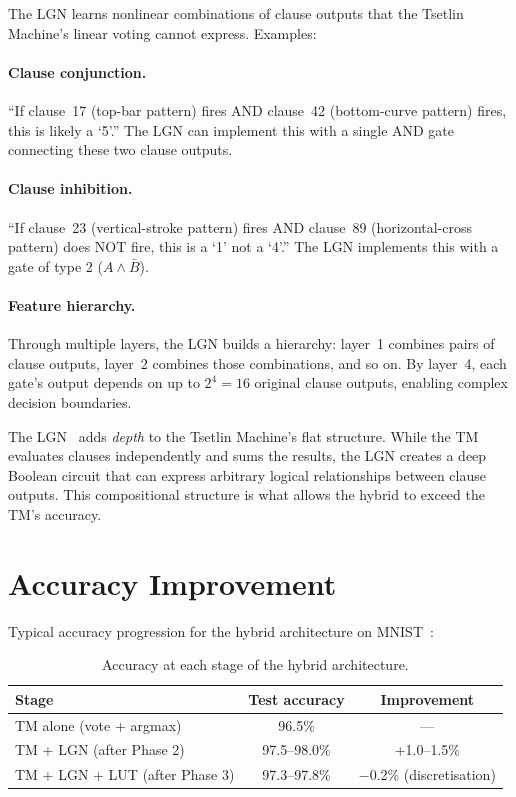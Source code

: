 The LGN learns nonlinear combinations of clause outputs that the
Tsetlin Machine's linear voting cannot express. Examples:

\paragraph{Clause conjunction.}
``If clause~17 (top-bar pattern) fires AND clause~42 (bottom-curve
pattern) fires, this is likely a `5'.'' The LGN can implement this
with a single AND gate connecting these two clause outputs.

\paragraph{Clause inhibition.}
``If clause~23 (vertical-stroke pattern) fires AND clause~89
(horizontal-cross pattern) does NOT fire, this is a `1' not a `4'.''
The LGN implements this with a gate of type 2 ($A \wedge \bar{B}$).

\paragraph{Feature hierarchy.}
Through multiple layers, the LGN builds a hierarchy: layer~1 combines
pairs of clause outputs, layer~2 combines those combinations, and so
on. By layer~4, each gate's output depends on up to $2^4 = 16$
original clause outputs, enabling complex decision boundaries.

\begin{keyinsight}
The LGN~\cite{petersen2022difflogic} adds \emph{depth} to the Tsetlin Machine's flat structure.
While the TM evaluates clauses independently and sums the results,
the LGN creates a deep Boolean circuit that can express arbitrary
logical relationships between clause outputs. This compositional
structure is what allows the hybrid to exceed the TM's accuracy.
\end{keyinsight}


\section{Accuracy Improvement}
\label{sec:lgn-accuracy}

Typical accuracy progression for the hybrid architecture on MNIST~\cite{lecun1998mnist}:

\begin{table}[htbp]
\centering
\caption{Accuracy at each stage of the hybrid architecture.}
\label{tab:stage-accuracy}
\begin{tabular}{@{}lcc@{}}
  \toprule
  \textbf{Stage} & \textbf{Test accuracy} & \textbf{Improvement} \\
  \midrule
  TM alone (vote + argmax) & 96.5\% & --- \\
  TM + LGN (after Phase 2) & 97.5--98.0\% & +1.0--1.5\% \\
  TM + LGN + LUT (after Phase 3) & 97.3--97.8\% & $-$0.2\% (discretisation) \\
  \bottomrule
\end{tabular}
\end{table}

